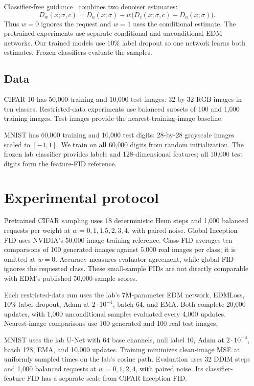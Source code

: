 \documentclass[11pt]{article}
\begin{document}
Classifier-free guidance~\cite{ho2022} combines two denoiser estimates:
\[
 D_w(x;\sigma,c)=D_u(x;\sigma)+w\bigl(D_c(x;\sigma,c)-D_u(x;\sigma)\bigr).
\]
Thus $w=0$ ignores the request and $w=1$ uses the conditional estimate. The pretrained experiments use separate conditional and unconditional EDM networks. Our trained models use 10\% label dropout so one network learns both estimates. Frozen classifiers evaluate the samples.

\subsection{Data}
CIFAR-10 has 50,000 training and 10,000 test images: 32-by-32 RGB images in ten classes. Restricted-data experiments use balanced subsets of 100 and 1,000 training images. Test images provide the nearest-training-image baseline.

MNIST has 60,000 training and 10,000 test digits: 28-by-28 grayscale images scaled to $[-1,1]$. We train on all 60,000 digits from random initialization. The frozen lab classifier provides labels and 128-dimensional features; all 10,000 test digits form the feature-FID reference.

\section{Experimental protocol}
Pretrained CIFAR sampling uses 18 deterministic Heun steps and 1,000 balanced requests per weight at $w=0,1,1.5,2,3,4$, with paired noise. Global Inception FID uses NVIDIA's 50,000-image training reference. Class FID averages ten comparisons of 100 generated images against 5,000 real images per class; it is omitted at $w=0$. Accuracy measures evaluator agreement, while global FID ignores the requested class. These small-sample FIDs are not directly comparable with EDM's published 50,000-sample scores.

Each restricted-data run uses the lab's 7M-parameter EDM network, EDMLoss, 10\% label dropout, Adam at $2\cdot10^{-4}$, batch 64, and EMA. Both complete 20,000 updates, with 1,000 unconditional samples evaluated every 4,000 updates. Nearest-image comparisons use 100 generated and 100 real test images.

MNIST uses the lab U-Net with 64 base channels, null label 10, Adam at $2\cdot10^{-4}$, batch 128, EMA, and 10,000 updates. Training minimizes clean-image MSE at uniformly sampled times on the lab's cosine path. Evaluation uses 32 DDIM steps and 1,000 balanced requests at $w=0,1,2,4$, with paired noise. Its classifier-feature FID has a separate scale from CIFAR Inception FID.
\end{document}
